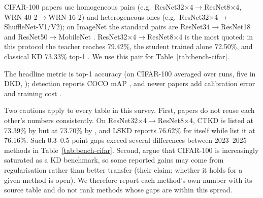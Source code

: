 CIFAR-100 papers use homogeneous pairs (e.g.\ ResNet32$\times$4$\to$ResNet8$\times$4,
WRN-40-2$\to$WRN-16-2) and heterogeneous ones (e.g.\ ResNet32$\times$4$\to$ShuffleNet-V1/V2); on ImageNet the standard pairs are ResNet34$\to$ResNet18 and
ResNet50$\to$MobileNet \citep{zhao2022dkd}. ResNet32$\times$4$\to$ResNet8$\times$4 is the most quoted: in this protocol the teacher reaches 79.42\%, the student trained
alone 72.50\%, and classical KD 73.33\% top-1 \citep[Table~6]{zhao2022dkd}. We use this pair for
Table~\ref{tab:bench-cifar}.

The headline metric is top-1 accuracy (on CIFAR-100 averaged over runs, five in DKD,
\citealp{zhao2022dkd}); detection reports COCO mAP
\citep{li2023ctkd}, and newer papers add calibration error and training cost \citep{hossain2025luminet}.

Two cautions apply to every table in this survey. First, papers do not reuse each other's numbers
consistently. On ResNet32$\times$4$\to$ResNet8$\times$4, CTKD is listed at 73.39\% by
\citet{sun2024lskd} but at 73.70\% by \citet{xu2025ldrld}, and LSKD reports 76.62\% for itself while
\citet{xu2025ldrld} list it at 76.16\%. Such 0.3--0.5-point gaps exceed several differences between 2023--2025 methods in Table~\ref{tab:bench-cifar}. Second, \citet{miles2024vkd} argue that CIFAR-100 is increasingly saturated as a KD
benchmark, so some reported gains may come from regularisation rather than better transfer
(their claim; whether it holds for a given method is open).
We therefore report each method's own number with its source table and do not rank methods whose
gaps are within this spread.
